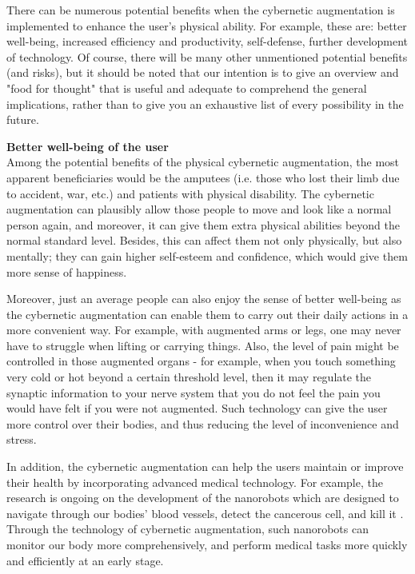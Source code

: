 There can be numerous potential benefits when the cybernetic augmentation is implemented to enhance the user's physical ability. For example, these are: better well-being, increased efficiency and productivity, self-defense, further development of technology. Of course, there will be many other unmentioned potential benefits (and risks), but it should be noted that our intention is to give an overview and "food for thought" that is useful and adequate to comprehend the general implications, rather than to give you an exhaustive list of every possibility in the future. 


{\bf Better well-being of the user} \\
Among the potential benefits of the physical cybernetic augmentation, the most apparent beneficiaries would be the amputees (i.e. those who lost their limb due to accident, war, etc.) and patients with physical disability. The cybernetic augmentation can plausibly allow those people to move and look like a normal person again, and moreover, it can give them extra physical abilities beyond the normal standard level. Besides, this can affect them not only physically, but also mentally; they can gain higher self-esteem and confidence, which would give them more sense of happiness. 

Moreover, just an average people can also enjoy the sense of better well-being as the cybernetic augmentation can enable them to carry out their daily actions in a more convenient way. For example, with augmented arms or legs, one may never have to struggle when lifting or carrying things. Also, the level of pain might be controlled in those augmented organs - for example, when you touch something very cold or hot beyond a certain threshold level, then it may regulate the synaptic information to your nerve system that you do not feel the pain you would have felt if you were not augmented. Such technology can give the user more control over their bodies, and thus reducing the level of inconvenience and stress.

In addition, the cybernetic augmentation can help the users maintain or improve their health by incorporating advanced medical technology. For example, the research is ongoing on the development of the nanorobots which are designed to navigate through our bodies' blood vessels, detect the cancerous cell, and kill it \cite{nanorobot}. Through the technology of cybernetic augmentation, such nanorobots can monitor our body more comprehensively, and perform medical tasks more quickly and efficiently at an early stage. 

